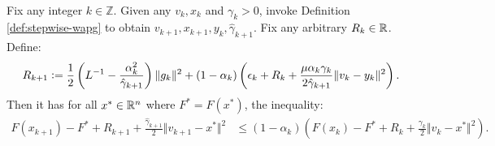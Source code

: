 \documentclass[12pt]{article}
\begin{document}
        \begin{proposition}\label{prop:stepwise-lyapunov}\;\\
            Fix any integer $k \in \mathbb Z$.
            Given any $v_k, x_k$ and $\gamma_k > 0$, invoke Definition \ref{def:stepwise-wapg} to obtain $v_{k + 1}, x_{k + 1}, y_k, \hat \gamma_{k + 1}$. 
            Fix any arbitrary $R_k \in \mathbb R$.
            Define: 
            \begin{align*}
                R_{k + 1}
                \vcentcolon=
                \frac{1}{2}\left(
                    L^{-1} - \frac{\alpha_k^2}{\hat \gamma_{k + 1}}
                \right)\Vert g_k\Vert^2
                + 
                (1 - \alpha_k)
                \left(
                    \epsilon_k + R_k + 
                    \frac{\mu\alpha_k\gamma_k}{2\hat \gamma_{k + 1}}
                    \Vert v_k - y_k\Vert^2
                \right). 
            \end{align*}
            Then it has for all $x^* \in \mathbb R^n$ where $F^* = F(x^*)$, the inequality: 
            \begin{align*}
                F(x_{k + 1}) - F^* + R_{k + 1} + \frac{\hat \gamma_{k + 1}}{2}\Vert v_{k + 1} - x^*\Vert^2
                &\le 
                (1 - \alpha_k)
                \left(
                    F(x_k) - F^* + R_k + \frac{\gamma_{k}}{2}\Vert v_k - x^*\Vert^2
                \right). 
            \end{align*}
        \end{proposition}
\end{document}
